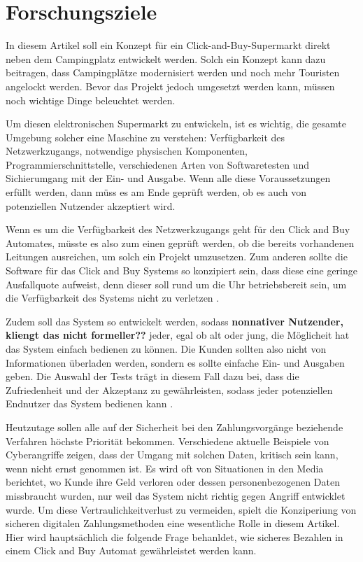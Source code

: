 \section{Forschungsziele}


In diesem Artikel soll ein Konzept für ein Click-and-Buy-Supermarkt direkt neben dem Campingplatz 
entwickelt werden. Solch ein Konzept kann dazu beitragen, dass Campingplätze modernisiert werden 
und noch mehr Touristen angelockt werden. Bevor das Projekt jedoch umgesetzt werden kann, müssen 
noch wichtige Dinge beleuchtet werden. 

Um diesen elektronischen Supermarkt zu entwickeln, ist es wichtig, die gesamte Umgebung solcher eine Maschine
zu verstehen: Verfügbarkeit des Netzwerkzugangs, notwendige physischen Komponenten, Programmierschnittstelle,
verschiedenen Arten von Softwaretesten und Sichierumgang mit der Ein- und Ausgabe. Wenn alle diese 
Voraussetzungen erfüllt werden, dann müss es am Ende geprüft werden, ob es auch von potenziellen Nutzender 
akzeptiert wird. 

Wenn es um die Verfügbarkeit des Netzwerkzugangs geht für den Click and Buy Automates, müsste es also zum einen 
geprüft werden, ob die bereits vorhandenen Leitungen ausreichen, um solch ein Projekt umzusetzen. Zum anderen 
sollte die Software für das Click and Buy Systems so konzipiert sein, dass diese eine geringe Ausfallquote
aufweist, denn dieser soll rund um die Uhr betriebsbereit sein, um die Verfügbarkeit des Systems nicht zu
verletzen \cite{refbook:SWIS}.

Zudem soll das System so entwickelt werden, sodass \textbf{nonnativer Nutzender, kliengt das nicht 
formeller??} jeder, egal ob alt oder jung, die Möglicheit hat das System einfach bedienen zu können. 
Die Kunden sollten also nicht von Informationen überladen werden, sondern es sollte einfache Ein- 
und Ausgaben geben. Die Auswahl der Tests trägt in diesem Fall dazu bei, dass die Zufriedenheit
und der Akzeptanz zu gewährleisten, sodass jeder potenziellen Endnutzer das System bedienen kann \cite{refbook:IASE}.


Heutzutage sollen alle auf der Sicherheit bei den Zahlungsvorgänge beziehende Verfahren höchste 
Priorität bekommen. Verschiedene aktuelle Beispiele von Cyberangriffe zeigen, dass der Umgang mit solchen 
Daten, kritisch sein kann, wenn nicht ernst genommen ist. Es wird oft von Situationen in den Media berichtet,
wo Kunde ihre Geld verloren oder dessen personenbezogenen Daten missbraucht wurden, nur weil das System
nicht richtig gegen Angriff entwicklet wurde. Um diese Vertraulichkeitverlust zu vermeiden, spielt die 
Konziperiung von sicheren digitalen Zahlungsmethoden eine wesentliche Rolle in diesem Artikel. 
Hier wird hauptsächlich die folgende Frage behanldet, wie sicheres Bezahlen in einem Click and Buy 
Automat gewährleistet werden kann.